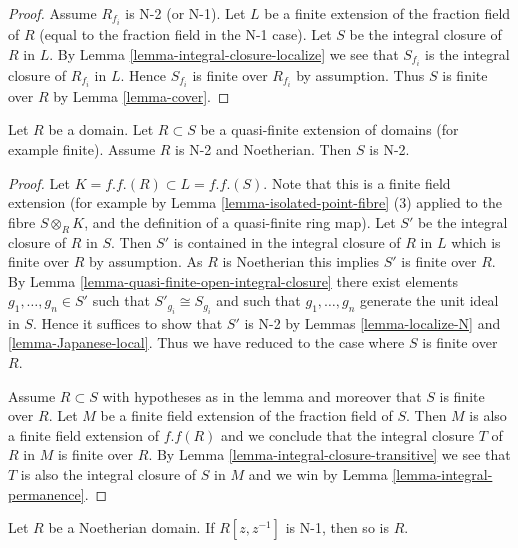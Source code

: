 \begin{proof}
Assume $R_{f_i}$ is N-2 (or N-1).
Let $L$ be a finite extension of the fraction field of $R$ (equal to
the fraction field in the N-1 case). Let $S$ be the integral
closure of $R$ in $L$. By Lemma \ref{lemma-integral-closure-localize}
we see that $S_{f_i}$ is the integral closure of $R_{f_i}$ in $L$.
Hence $S_{f_i}$ is finite over $R_{f_i}$ by assumption.
Thus $S$ is finite over $R$ by Lemma \ref{lemma-cover}.
\end{proof}

\begin{lemma}
\label{lemma-quasi-finite-over-Noetherian-japanese}
Let $R$ be a domain.
Let $R \subset S$ be a quasi-finite extension of domains
(for example finite).
Assume $R$ is N-2 and Noetherian.
Then $S$ is N-2.
\end{lemma}

\begin{proof}
Let $K = f.f.(R) \subset L = f.f.(S)$. Note that this is
a finite field extension (for example by
Lemma \ref{lemma-isolated-point-fibre} (3) applied
to the fibre $S \otimes_R K$, and the definition of a
quasi-finite ring map).
Let $S'$ be the integral closure of $R$ in $S$.
Then $S'$ is contained in the integral closure of $R$ in $L$
which is finite over $R$ by assumption. As $R$ is Noetherian this
implies $S'$ is finite over $R$.
By Lemma \ref{lemma-quasi-finite-open-integral-closure}
there exist elements $g_1, \ldots, g_n \in S'$
such that $S'_{g_i} \cong S_{g_i}$ and such that $g_1, \ldots, g_n$
generate the unit ideal in $S$. Hence it suffices to show that
$S'$ is N-2 by Lemmas \ref{lemma-localize-N} and \ref{lemma-Japanese-local}.
Thus we have reduced to the case where $S$ is finite over $R$.

\medskip\noindent
Assume $R \subset S$ with hypotheses as in the lemma and moreover
that $S$ is finite over $R$. Let $M$ be a finite field extension
of the fraction field of $S$. Then $M$ is also a finite field extension
of $f.f(R)$ and we conclude that the integral closure $T$ of $R$ in
$M$ is finite over $R$. By Lemma \ref{lemma-integral-closure-transitive}
we see that $T$ is also the integral closure of $S$ in $M$ and we win by
Lemma \ref{lemma-integral-permanence}.
\end{proof}

\begin{lemma}
\label{lemma-Laurent-ring-N-1}
Let $R$ be a Noetherian domain.
If $R[z, z^{-1}]$ is N-1, then so is $R$.
\end{lemma}

